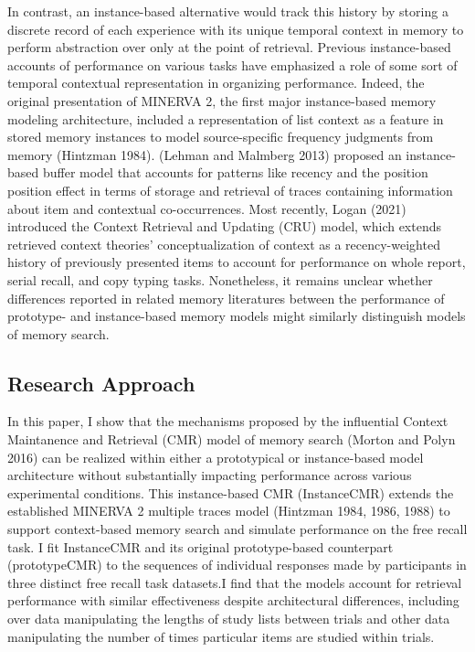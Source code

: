 \documentclass[
  letterpaper,
  DIV=11]{article}
\begin{document}
In contrast, an instance-based alternative would track this history by
storing a discrete record of each experience with its unique temporal
context in memory to perform abstraction over only at the point of
retrieval. Previous instance-based accounts of performance on various
tasks have emphasized a role of some sort of temporal contextual
representation in organizing performance. Indeed, the original
presentation of MINERVA 2, the first major instance-based memory
modeling architecture, included a representation of list context as a
feature in stored memory instances to model source-specific frequency
judgments from memory (Hintzman 1984). (Lehman and Malmberg 2013)
proposed an instance-based buffer model that accounts for patterns like
recency and the position position effect in terms of storage and
retrieval of traces containing information about item and contextual
co-occurrences. Most recently, Logan (2021) introduced the Context
Retrieval and Updating (CRU) model, which extends retrieved context
theories' conceptualization of context as a recency-weighted history of
previously presented items to account for performance on whole report,
serial recall, and copy typing tasks. Nonetheless, it remains unclear
whether differences reported in related memory literatures between the
performance of prototype- and instance-based memory models might
similarly distinguish models of memory search.

\hypertarget{research-approach}{%
\subsection{Research Approach}\label{research-approach}}

In this paper, I show that the mechanisms proposed by the influential
Context Maintanence and Retrieval (CMR) model of memory search (Morton
and Polyn 2016) can be realized within either a prototypical or
instance-based model architecture without substantially impacting
performance across various experimental conditions. This instance-based
CMR (InstanceCMR) extends the established MINERVA 2 multiple traces
model (Hintzman 1984, 1986, 1988) to support context-based memory search
and simulate performance on the free recall task. I fit InstanceCMR and
its original prototype-based counterpart (prototypeCMR) to the sequences
of individual responses made by participants in three distinct free
recall task datasets.I find that the models account for retrieval
performance with similar effectiveness despite architectural
differences, including over data manipulating the lengths of study lists
between trials and other data manipulating the number of times
particular items are studied within trials.
\end{document}
